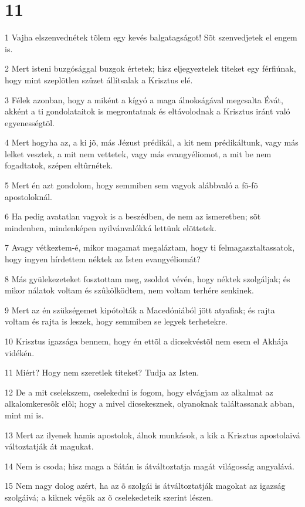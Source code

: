 \chapter{11}

\par 1 Vajha elszenvednétek tõlem egy kevés balgatagságot! Sõt szenvedjetek el engem is.
\par 2 Mert isteni buzgósággal buzgok értetek; hisz eljegyeztelek titeket egy férfiúnak, hogy mint szeplõtlen szûzet állítsalak a Krisztus elé.
\par 3 Félek azonban, hogy a miként a kígyó a maga álnokságával megcsalta Évát, akként a ti gondolataitok is megrontatnak és eltávolodnak a Krisztus iránt való egyenességtõl.
\par 4 Mert hogyha az, a ki jõ, más Jézust prédikál, a kit nem prédikáltunk, vagy más lelket vesztek, a mit nem vettetek, vagy más evangyéliomot, a mit be nem fogadtatok, szépen eltûrnétek.
\par 5 Mert én azt gondolom, hogy semmiben sem vagyok alábbvaló a fõ-fõ apostoloknál.
\par 6 Ha pedig avatatlan vagyok is a beszédben, de nem az ismeretben; sõt mindenben, mindenképen nyilvánvalókká lettünk elõttetek.
\par 7 Avagy vétkeztem-é, mikor magamat megaláztam, hogy ti felmagasztaltassatok, hogy ingyen hírdettem néktek az Isten evangyéliomát?
\par 8 Más gyülekezeteket fosztottam meg, zsoldot vévén, hogy néktek szolgáljak; és mikor nálatok voltam és szûkölködtem, nem voltam terhére senkinek.
\par 9 Mert az én szükségemet kipótolták a Macedóniából jött atyafiak; és rajta voltam és rajta is leszek, hogy semmiben se legyek terhetekre.
\par 10 Krisztus igazsága bennem, hogy én ettõl a dicsekvéstõl nem esem el Akhája vidékén.
\par 11 Miért? Hogy nem szeretlek titeket? Tudja az Isten.
\par 12 De a mit cselekszem, cselekedni is fogom, hogy elvágjam az alkalmat az alkalomkeresõk elõl; hogy a mivel dicsekesznek, olyanoknak találtassanak abban, mint mi is.
\par 13 Mert az ilyenek hamis apostolok, álnok munkások, a kik a Krisztus apostolaivá változtatják át magukat.
\par 14 Nem is csoda; hisz maga a Sátán is átváltoztatja magát világosság angyalává.
\par 15 Nem nagy dolog azért, ha az õ szolgái is átváltoztatják magokat az igazság szolgáivá; a kiknek végök az õ cselekedeteik szerint lészen.
